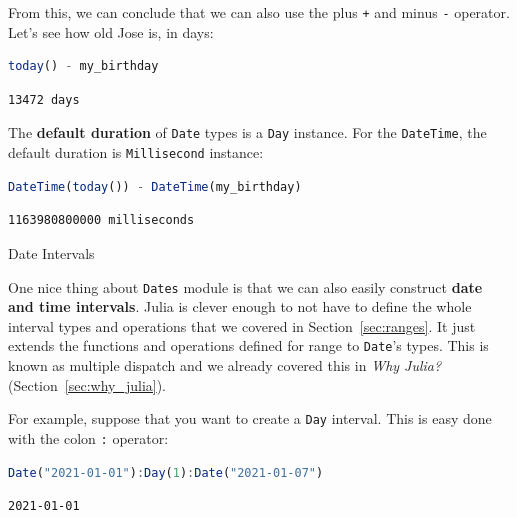 \documentclass[
  notoc %
]{tufte-book}
\makeatletter
\newcommand{\passthrough}[1]{#1}
\renewcommand\subsubsection{%
\@startsection{subsubsection}{3}{\z@ }{-3.25ex\@plus -1ex \@minus -.2ex}{1.5ex \@plus .2ex}{\normalfont \normalsize \bfseries }
}
\makeatother
\begin{document}
From this, we can conclude that we can also use the plus
\passthrough{\lstinline!+!} and minus \passthrough{\lstinline!-!}
operator. Let's see how old Jose is, in days:

\begin{lstlisting}[language=Julia]
today() - my_birthday
\end{lstlisting}

\begin{lstlisting}[language=Output]
13472 days
\end{lstlisting}

The \textbf{default duration} of \passthrough{\lstinline!Date!} types is
a \passthrough{\lstinline!Day!} instance. For the
\passthrough{\lstinline!DateTime!}, the default duration is
\passthrough{\lstinline!Millisecond!} instance:

\begin{lstlisting}[language=Julia]
DateTime(today()) - DateTime(my_birthday)
\end{lstlisting}

\begin{lstlisting}[language=Output]
1163980800000 milliseconds
\end{lstlisting}

\hypertarget{sec:dates_intervals}{%
\subsubsection{Date Intervals}\label{sec:dates_intervals}}

One nice thing about \passthrough{\lstinline!Dates!} module is that we
can also easily construct \textbf{date and time intervals}. Julia is
clever enough to not have to define the whole interval types and
operations that we covered in Section~\ref{sec:ranges}. It just extends
the functions and operations defined for range to
\passthrough{\lstinline!Date!}'s types. This is known as multiple
dispatch and we already covered this in \emph{Why Julia?}
(Section~\ref{sec:why_julia}).

For example, suppose that you want to create a
\passthrough{\lstinline!Day!} interval. This is easy done with the colon
\passthrough{\lstinline!:!} operator:

\begin{lstlisting}[language=Julia]
Date("2021-01-01"):Day(1):Date("2021-01-07")
\end{lstlisting}

\begin{lstlisting}[language=Output]
2021-01-01
\end{lstlisting}
\end{document}
